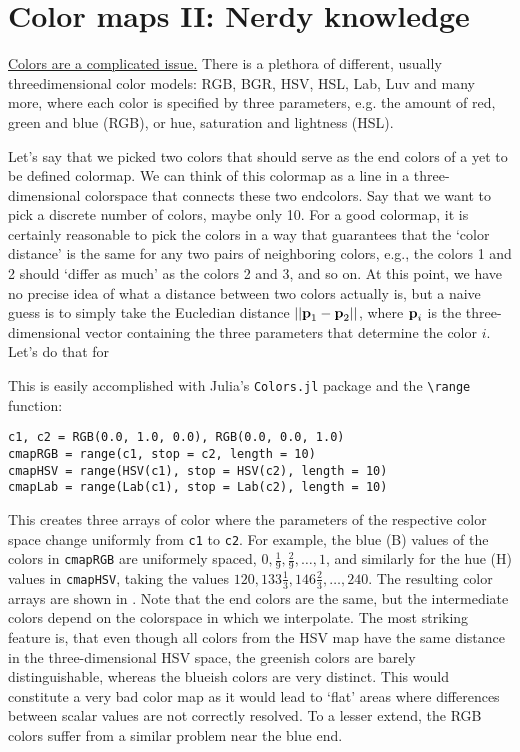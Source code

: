 \section{Color maps II: Nerdy knowledge}
\href{https://xkcd.com/1882/}{Colors are a complicated issue.} There is a plethora of different, usually threedimensional color models: RGB, BGR, HSV, HSL, Lab, Luv and many more, where each color is specified by three parameters, e.g. the amount of red, green and blue (RGB), or hue, saturation and lightness (HSL).   

Let's say that we picked two colors that should serve as the end colors of a yet to be defined colormap. We can think of this colormap as a line in a three-dimensional colorspace that connects these two endcolors. Say that we want to pick a discrete number of colors, maybe only 10. 
For a good colormap, it is certainly reasonable to pick the colors in a way that guarantees that the `color distance' is the same for any two pairs of neighboring colors, e.g., the colors 1 and 2 should `differ as much' as the colors 2 and 3, and so on. At this point, we have no precise idea of what a distance between two colors actually is, but a naive guess is to simply take the Eucledian distance $||\textbf{p}_1-\textbf{p}_2||$, where $\textbf{p}_i$ is the three-dimensional vector containing the three parameters that determine the color $i$. 
Let's do that for 


This is easily accomplished with Julia's \verb|Colors.jl| package and the \verb|\range| function:
\begin{listing}[h]
\begin{verbatim} 
c1, c2 = RGB(0.0, 1.0, 0.0), RGB(0.0, 0.0, 1.0)
cmapRGB = range(c1, stop = c2, length = 10) 
cmapHSV = range(HSV(c1), stop = HSV(c2), length = 10) 
cmapLab = range(Lab(c1), stop = Lab(c2), length = 10) 
\end{verbatim}
\end{listing}
This creates three arrays of color where the parameters of the respective color space change uniformly from \verb|c1| to \verb|c2|. For example, the blue (B) values of the colors in \verb|cmapRGB| are uniformely spaced, $0,\frac{1}{9},\frac{2}{9},\ldots,1$, and similarly for the hue (H) values in  \verb|cmapHSV|, taking the values $120,133\frac{1}{3},146\frac{2}{3},\ldots,240$.
The resulting color arrays are shown in . Note that the end colors are the same, but the intermediate colors depend on the colorspace in which we interpolate. The most striking feature is, that even though all colors from the HSV map have the same distance in the three-dimensional HSV space, the greenish colors are barely distinguishable, whereas the blueish colors are very distinct. This would constitute a very bad color map as it would lead to `flat' areas where differences between scalar values are not correctly resolved. To a lesser extend, the RGB colors suffer from a similar problem near the blue end.

